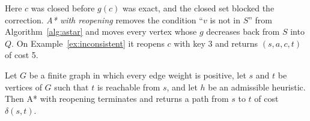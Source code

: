 Here $c$ was closed before $g(c)$ was exact, and the closed set blocked the
correction. \emph{A* with reopening} removes the condition ``$v$ is not in $S$''
from Algorithm~\ref{alg:astar} and moves every vertex whose $g$ decreases back
from $S$ into $Q$. On Example~\ref{ex:inconsistent} it reopens $c$ with key 3 and
returns $(s,a,c,t)$ of cost 5.

\begin{theorem}\label{thm:admissible}
Let $G$ be a finite graph in which every edge weight is positive, let $s$ and $t$
be vertices of $G$ such that $t$ is reachable from $s$, and let $h$ be an
admissible heuristic. Then A* with reopening terminates and returns a path from
$s$ to $t$ of cost $\delta(s,t)$.
\end{theorem}

